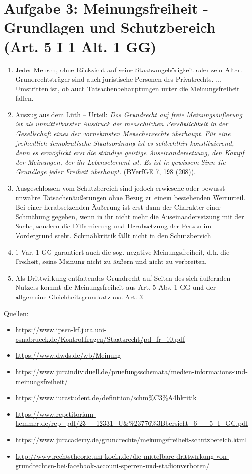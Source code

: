 \documentclass{article}
\begin{document}
	\section*{Aufgabe 3: Meinungsfreiheit - Grundlagen und Schutzbereich (Art. 5 I 1 Alt. 1 GG)}
	\begin{enumerate}[label=(\alph*)]
		\item Jeder Mensch, ohne Rücksicht auf seine Staatsangehörigkeit oder sein Alter. Grundrechtsträger sind auch juristische Personen des Privatrechts. ... Umstritten ist, ob auch Tatsachenbehauptungen unter die Meinungsfreiheit fallen.
		\item Auszug aus dem Lüth – Urteil: \textit{Das Grundrecht auf freie Meinungsäußerung ist als unmittelbarster Ausdruck der menschlichen Persönlichkeit in der Gesellschaft eines der vornehmsten Menschenrechte überhaupt. Für eine freiheitlich-demokratische Staatsordnung ist es schlechthin konstituierend, denn es ermöglicht erst die ständige geistige Auseinandersetzung, den Kampf der  Meinungen, der ihr Lebenselement ist. Es ist in gewissem Sinn die Grundlage jeder Freiheit überhaupt.} (BVerfGE 7, 198 (208)).
		\item Ausgeschlossen vom Schutzbereich sind jedoch erwiesene oder bewusst unwahre Tatsachenäußerungen ohne Bezug zu einem bestehenden Werturteil. Bei einer herabsetzenden Äußerung ist erst dann der Charakter einer Schmähung gegeben, wenn in ihr nicht mehr die Auseinandersetzung mit der Sache, sondern die Diffamierung und Herabsetzung der Person im Vordergrund steht. Schmähkrittik fällt nicht in den Schutzbereich
		\item 1 Var. 1 GG garantiert auch die sog. negative Meinungsfreiheit, d.h. die Freiheit, seine Meinung nicht zu äußern und nicht zu verbreiten.
		\item Als Drittwirkung entfaltendes Grundrecht auf Seiten des sich äußernden Nutzers kommt die Meinungsfreiheit aus Art. 5 Abs. 1 GG und der allgemeine Gleichheitsgrundsatz aus Art. 3
	\end{enumerate}

	Quellen:
	\begin{itemize}
		\item \url{https://www.ipsen-kf.jura.uni-osnabrueck.de/Kontrollfragen/Staatsrecht/pd_fr_10.pdf}
		\item \url{https://www.dwds.de/wb/Meinung}
		\item \url{https://www.juraindividuell.de/pruefungsschemata/medien-informations-und-meinungsfreiheit/}
		\item \url{https://www.iurastudent.de/definition/schm%C3%A4hkritik}
		\item \url{https://www.repetitorium-hemmer.de/rep_pdf/23__12331_U&%23776%3Bbersicht_6_-_5_I_GG.pdf}
		\item \url{https://www.juracademy.de/grundrechte/meinungsfreiheit-schutzbereich.html}
		\item \url{http://www.rechtstheorie.uni-koeln.de/die-mittelbare-drittwirkung-von-grundrechten-bei-facebook-account-sperren-und-stadionverboten/}
	\end{itemize}
\end{document}
